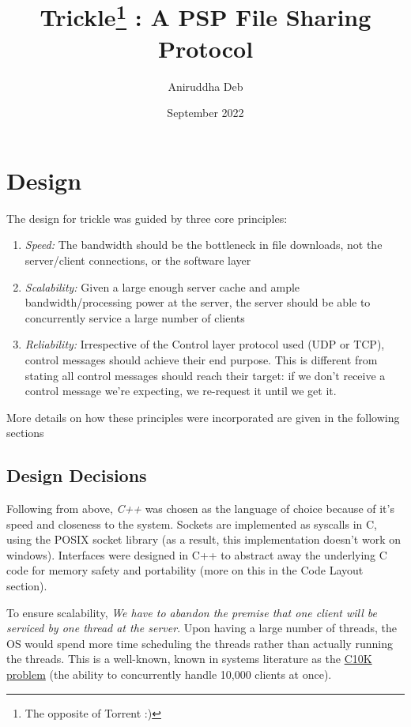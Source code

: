 \documentclass[12pt]{article}
\title{\textbf{Trickle\footnote{The opposite of Torrent :)} : A PSP File Sharing Protocol}}
\author{Aniruddha Deb}
\date{September 2022}
\begin{document}
\maketitle

\tableofcontents

\clearpage

\section{Design}

The design for trickle was guided by three core principles:
\begin{enumerate}
\item \emph{Speed:} The bandwidth should be the bottleneck in file downloads, not the server/client connections, or the software layer
\item \emph{Scalability:} Given a large enough server cache and ample bandwidth/processing power at the server, the server should be able to concurrently service a large number of clients
\item \emph{Reliability:} Irrespective of the Control layer protocol used (UDP or TCP), control messages should achieve their end purpose. This is different from stating all control messages should reach their target: if we don't receive a control message we're expecting, we re-request it until we get it.
\end{enumerate}

More details on how these principles were incorporated are given in the following sections

\subsection{Design Decisions}

Following from above, \emph{C++} was chosen as the language of choice because of it's speed and closeness to the system. Sockets are implemented as syscalls in C, using the POSIX socket library (as a result, this implementation doesn't work on windows). Interfaces were designed in C++ to abstract away the underlying C code for memory safety and portability (more on this in the Code Layout section).

To ensure scalability, \emph{We have to abandon the premise that one client will be serviced by one thread at the server}. Upon having a large number of threads, the OS would spend more time scheduling the threads rather than actually running the threads. This is a well-known, known in systems literature as the \href{https://en.wikipedia.org/wiki/C10k_problem#}{C10K problem} (the ability to concurrently handle 10,000 clients at once).
\end{document}
